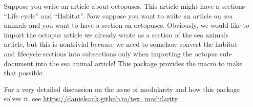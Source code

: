 Suppose you write an article about octopuses.
This article might have a sections ``Life cycle'' and ``Habitat''.
Now suppose you want to write an article on sea animals and you want to have a section on octopuses.
Obviously, we would like to import the octopus article we already wrote as a section of the sea animals article, but this is nontrivial because we need to somehow convert the habitat and lifecycle sections into subsections only when importing the octopus sub-document into the sea animal article!
This package provides the  macro to make that possible.

For a very detailed discussion on the issue of modularity and how this package solves it, see \href{https://danielsank.github.io/tex_modularity/}{https://danielsank.github.io/tex\_modularity}.

